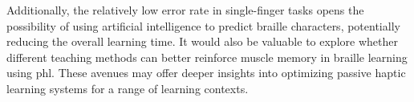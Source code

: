 Additionally, the relatively low error rate in single-finger tasks opens the possibility of using artificial intelligence to predict braille characters, potentially reducing the overall learning time. It would also be valuable to explore whether different teaching methods can better reinforce muscle memory in braille learning using \gls{phl}. These avenues may offer deeper insights into optimizing passive haptic learning systems for a range of learning contexts.




